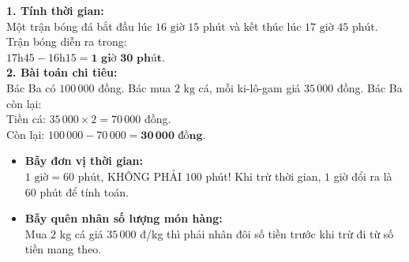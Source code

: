\documentclass[11pt,a4paper]{article}
\begin{document}
\vspace{-2.5mm}
\noindent
\begin{minipage}[t]{0.49\textwidth}\vspace{0pt}
\begin{tcolorbox}[
  enhanced,
  colback=green!4!white,
  colframe=green!60!black,
  arc=2mm, boxrule=0.8pt,
  left=2mm, right=2mm, top=1.8mm, bottom=1.8mm,
  title={\footnotesize\bfseries\color{white}\faCheckCircle\ Ví dụ thực hành chuẩn mực}
]
{\footnotesize
\textbf{1. Tính thời gian:}\\
Một trận bóng đá bắt đầu lúc $16\text{ giờ } 15\text{ phút}$ và kết thúc lúc $17\text{ giờ } 45\text{ phút}$. Trận bóng diễn ra trong:\\
$17\text{h}45 - 16\text{h}15 = \mathbf{1\text{ giờ } 30\text{ phút}}$.\\
\textbf{2. Bài toán chi tiêu:}\\
Bác Ba có $100\,000$ đồng. Bác mua $2\text{ kg}$ cá, mỗi ki-lô-gam giá $35\,000$ đồng. Bác Ba còn lại:\\
Tiền cá: $35\,000 \times 2 = 70\,000$ đồng.\\
Còn lại: $100\,000 - 70\,000 = \mathbf{30\,000\text{ đồng}}$.
}
\end{tcolorbox}
\end{minipage}
\hfill
\begin{minipage}[t]{0.49\textwidth}\vspace{0pt}
\begin{tcolorbox}[
  enhanced,
  colback=red!4!white,
  colframe=red!70!black,
  arc=2mm, boxrule=0.8pt,
  left=2mm, right=2mm, top=1.8mm, bottom=1.8mm,
  title={\footnotesize\bfseries\color{white}\faExclamationTriangle\ Mẹo tránh bẫy trắc nghiệm}
]
{\footnotesize
\begin{itemize}\setlength{\itemsep}{1.5pt}\setlength{\leftskip}{-2.5mm}
  \item \textbf{Bẫy đơn vị thời gian:}\\
  $1\text{ giờ} = 60\text{ phút}$, KHÔNG PHẢI $100$ phút! Khi trừ thời gian, $1$ giờ đổi ra là $60$ phút để tính toán.
  \item \textbf{Bẫy quên nhân số lượng món hàng:}\\
  Mua $2$ kg cá giá $35\,000$ đ/kg thì phải nhân đôi số tiền trước khi trừ đi từ số tiền mang theo.
\end{itemize}
}
\end{tcolorbox}
\end{minipage}
\end{document}
